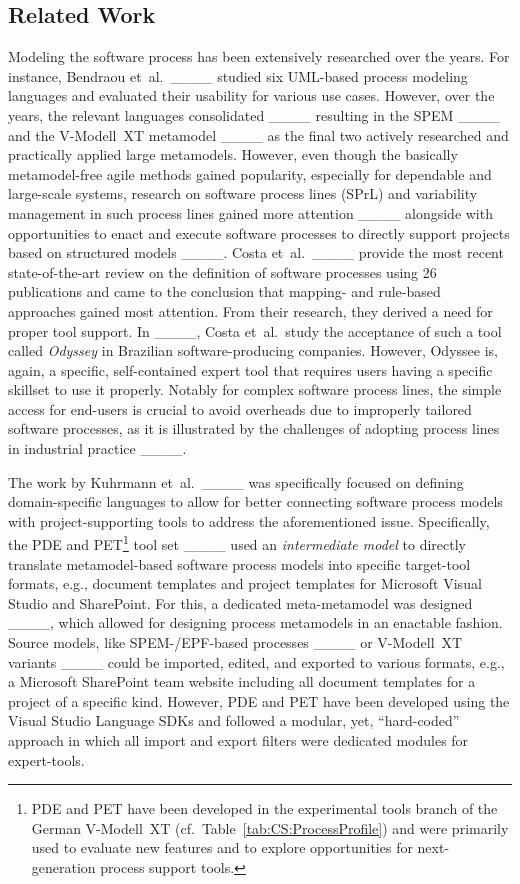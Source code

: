\subsection{Related Work}
\label{sec:BGAndRW:RW}
Modeling the software process has been extensively researched over the years. For instance, Bendraou et~al.\ ____ studied six UML-based process modeling languages and evaluated their usability for various use cases. However, over the years, the relevant languages consolidated ____ resulting in the SPEM ____ and the V-Modell~XT metamodel ____ as the final two actively researched and practically applied large metamodels. However, even though the basically metamodel-free agile methods gained popularity, especially for dependable and large-scale systems, research on software process lines (SPrL) and variability management in such process lines gained more attention ____ alongside with opportunities to enact and execute software processes to directly support projects based on structured models ____. Costa et~al.\ ____ provide the most recent state-of-the-art review on the definition of software processes using 26 publications and came to the conclusion that mapping- and rule-based approaches gained most attention. From their research, they derived a need for proper tool support. In ____, Costa et~al.\ study the acceptance of such a tool called \emph{Odyssey} in Brazilian software-producing companies. However, Odyssee is, again, a specific, self-contained expert tool that requires users having a specific skillset to use it properly. Notably for complex software process lines, the simple access for end-users is crucial to avoid overheads due to improperly tailored software processes, as it is illustrated by the challenges of adopting process lines in industrial practice ____.

The work by Kuhrmann et~al.\ ____ was specifically focused on defining domain-specific languages to allow for better connecting software process models with project-supporting tools to address the aforementioned issue. Specifically, the PDE and PET\footnote{PDE and PET have been developed in the experimental tools branch of the German V-Modell~XT (cf.\ Table~\ref{tab:CS:ProcessProfile}) and were primarily used to evaluate new features and to explore opportunities for next-generation process support tools.} tool set ____ used an \emph{intermediate model} to directly translate metamodel-based software process models into specific target-tool formats, e.g., document templates and project templates for Microsoft Visual Studio and SharePoint. For this, a dedicated meta-metamodel was designed ____, which allowed for designing process metamodels in an enactable fashion. Source models, like SPEM-/EPF-based processes ____ or V-Modell~XT variants ____ could be imported, edited, and exported to various formats, e.g., a Microsoft SharePoint team website including all document templates for a project of a specific kind. However, PDE and PET have been developed using the Visual Studio Language SDKs and followed a modular, yet, ``hard-coded'' approach in which all import and export filters were dedicated modules for expert-tools.

